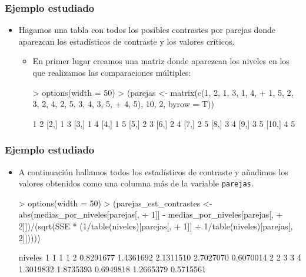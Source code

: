 \begin{frame}[fragile]
\frametitle{Ejemplo estudiado}
\begin{itemize}
\item<2-> Hagamos una tabla con todos los posibles contrastes por parejas donde aparezcan los estadísticos de contraste y los valores críticos.
\begin{itemize}
\item<3-> En primer lugar creamos una matriz donde aparezcan los niveles en los que realizamos las comparaciones múltiples:

{\small
\begin{Schunk}
\begin{Sinput}
> options(width = 50)
> (parejas <- matrix(c(1, 2, 1, 3, 1, 4, 
+     1, 5, 2, 3, 2, 4, 2, 5, 3, 4, 3, 5, 
+     4, 5), 10, 2, byrow = T))
\end{Sinput}
\begin{Soutput}
      [,1] [,2]
 [1,]    1    2
 [2,]    1    3
 [3,]    1    4
 [4,]    1    5
 [5,]    2    3
 [6,]    2    4
 [7,]    2    5
 [8,]    3    4
 [9,]    3    5
[10,]    4    5
\end{Soutput}
\end{Schunk}
}

\end{itemize}
\end{itemize}
\end{frame}
\begin{frame}[fragile]
\frametitle{Ejemplo estudiado}
\begin{itemize}
\item<2-> A continuación hallamos todos los estadísticos de contraste y añadimos los valores obtenidos como una columna más de la variable {\tt parejas}.

{\footnotesize
\begin{Schunk}
\begin{Sinput}
> options(width = 50)
> (parejas_est_contrastes <- abs(medias_por_niveles[parejas[, 
+     1]] - medias_por_niveles[parejas[, 
+     2]])/(sqrt(SSE * (1/table(niveles)[parejas[, 
+     1]] + 1/table(niveles)[parejas[, 2]]))))
\end{Sinput}
\begin{Soutput}
niveles
        1         1         1         1         2 
0.8291677 1.4361692 2.1311510 2.7027070 0.6070014 
        2         2         3         3         4 
1.3019832 1.8735393 0.6949818 1.2665379 0.5715561 
\end{Soutput}
\end{Schunk}
}

\end{itemize}
\end{frame}
